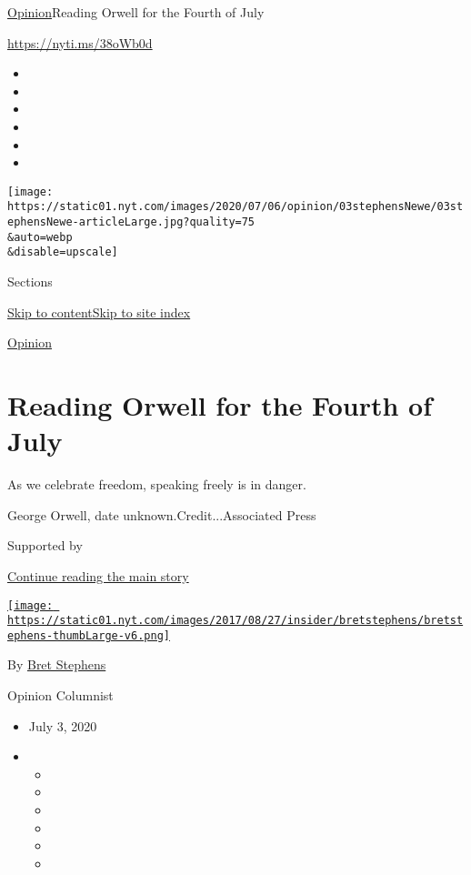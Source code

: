 \href{/section/opinion}{Opinion}\textbar{}Reading Orwell for the Fourth
of July

\href{https://nyti.ms/38oWb0d}{https://nyti.ms/38oWb0d}

\begin{itemize}
\item
\item
\item
\item
\item
\item
\end{itemize}

\texttt{[image: https://static01.nyt.com/images/2020/07/06/opinion/03stephensNewe/03stephensNewe-articleLarge.jpg?quality=75\\\&auto=webp\\\&disable=upscale]}

Sections

\protect\hyperlink{site-content}{Skip to
content}\protect\hyperlink{site-index}{Skip to site index}

\href{/section/opinion}{Opinion}

\hypertarget{reading-orwell-for-the-fourth-of-july}{%
\section{Reading Orwell for the Fourth of
July}\label{reading-orwell-for-the-fourth-of-july}}

As we celebrate freedom, speaking freely is in danger.

George Orwell, date unknown.Credit...Associated Press

Supported by

\protect\hyperlink{after-sponsor}{Continue reading the main story}

\href{https://www.nytimes.com/by/bret-stephens}{\texttt{[image: https://static01.nyt.com/images/2017/08/27/insider/bretstephens/bretstephens-thumbLarge-v6.png]}}

By \href{https://www.nytimes.com/by/bret-stephens}{Bret Stephens}

Opinion Columnist

\begin{itemize}
\item
  July 3, 2020
\item
  \begin{itemize}
  \item
  \item
  \item
  \item
  \item
  \item
  \end{itemize}
\end{itemize}

